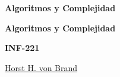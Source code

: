 \documentclass[czech, english, german, french, latin, spanish, fleqn]
              {memoir}
\theoremstyle{plain}
\theoremstyle{definition}
\theoremstyle{remark}
\begin{document}


\frontmatter


\thispagestyle{empty}
\vspace*{\fill}
{\fontsize{24}{26}\sffamily\bfseries
  Algoritmos y Complejidad \\
}
\vspace*{\fill}

\cleardoublepage


\thispagestyle{empty}
\vspace*{0.5cm}
\begin{center}
  {
    \fontsize{45}{47}\sffamily\bfseries
    Algoritmos y Complejidad
    \par
  }
  \vspace*{1em}
  {
    \fontsize{35}{37}\sffamily\bfseries
    INF-221
    \par
  }
\end{center}
\vfill
\vfill
\noindent
\begin{center}
  \huge\sffamily
    \href{mailto:vonbrand@inf.utfsm.cl}{Horst H. von Brand}
\end{center}
\vfill
\end{document}
